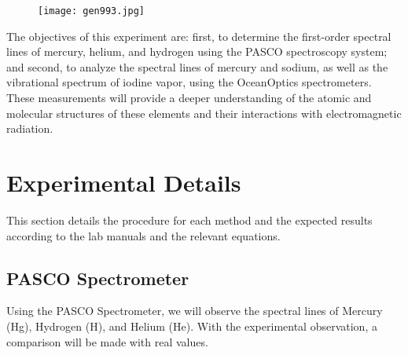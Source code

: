 \documentclass[12pt]{article}
\begin{document}
	\begin{figure}[!h]
		\centering
		\label{Diffraction}
		\texttt{[image: gen993.jpg]}
	\end{figure}
	
	The objectives of this experiment are: first, to determine the first-order spectral lines of mercury, helium, and hydrogen using the PASCO spectroscopy system; and second, to analyze the spectral lines of mercury and sodium, as well as the vibrational spectrum of iodine vapor, using the OceanOptics spectrometers. These measurements will provide a deeper understanding of the atomic and molecular structures of these elements and their interactions with electromagnetic radiation.

\clearpage

	\section{Experimental Details}
	
	This section details the procedure for each method and the expected results according to the lab manuals and the relevant equations.
	
	\subsection{PASCO Spectrometer}
	
	Using the PASCO Spectrometer, we will observe the spectral lines of Mercury (Hg), Hydrogen (H), and Helium (He). With the experimental observation, a comparison will be made with real values.
	
\end{document}
